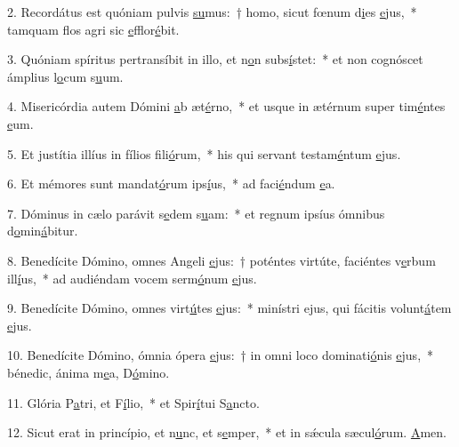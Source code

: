 2. Recordátus est quóniam pulvis \uline{su}mus:~† homo, sicut fœnum d\uline{i}es \uline{e}jus,~* tamquam flos agri sic \uline{e}fflor\uline{é}bit.\par 
3. Quóniam spíritus pertransíbit in illo, et n\uline{o}n subs\uline{í}stet:~* et non cognóscet ámplius l\uline{o}cum s\uline{u}um.\par 
4. Misericórdia autem Dómini \uline{a}b æt\uline{é}rno,~* et usque in ætérnum super tim\uline{é}ntes \uline{e}um.\par 
5. Et justítia illíus in fílios f\uline{i}li\uline{ó}rum,~* his qui servant testam\uline{é}ntum \uline{e}jus.\par 
6. Et mémores sunt mandat\uline{ó}rum ips\uline{í}us,~* ad faci\uline{é}ndum \uline{e}a.\par 
7. Dóminus in cælo parávit s\uline{e}dem s\uline{u}am:~* et regnum ipsíus ómnibus d\uline{o}min\uline{á}bitur.\par 
8. Benedícite Dómino, omnes Angeli \uline{e}jus:~† poténtes virtúte, faciéntes v\uline{e}rbum ill\uline{í}us,~* ad audiéndam vocem serm\uline{ó}num \uline{e}jus.\par 
9. Benedícite Dómino, omnes virt\uline{ú}tes \uline{e}jus:~* minístri ejus, qui fácitis volunt\uline{á}tem \uline{e}jus.\par 
10. Benedícite Dómino, ómnia ópera \uline{e}jus:~† in omni loco dominati\uline{ó}nis \uline{e}jus,~* bénedic, ánima m\uline{e}a, D\uline{ó}mino.\par 
11. Glória P\uline{a}tri, et F\uline{í}lio,~* et Spir\uline{í}tui S\uline{a}ncto.\par 
12. Sicut erat in princípio, et n\uline{u}nc, et s\uline{e}mper,~* et in sǽcula sæcul\uline{ó}rum. \uline{A}men.\par 
